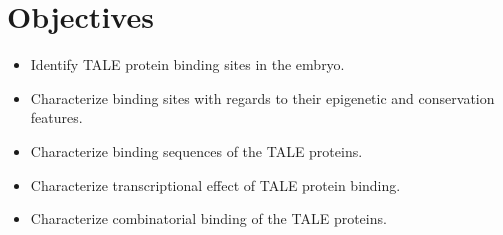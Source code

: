 \chapter{Objectives}
\label{chp:objectives}

\begin{itemize}

  \item Identify TALE protein binding sites in the embryo.
  
  \item Characterize binding sites with regards to their epigenetic and conservation features.
  
  \item Characterize binding sequences of the TALE proteins.
  
  \item Characterize transcriptional effect of TALE protein binding.
  
  \item Characterize combinatorial binding of the TALE proteins.
  
\end{itemize}